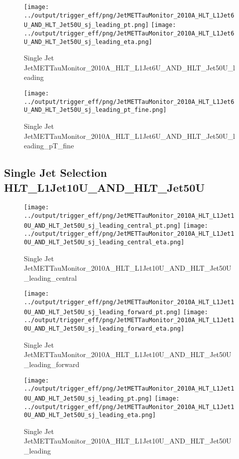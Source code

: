 \documentclass[11pt]{article}
\begin{document}
\begin{figure}[ht]
\centering
\texttt{[image: ../output/trigger\_eff/png/JetMETTauMonitor\_2010A\_HLT\_L1Jet6U\_AND\_HLT\_Jet50U\_sj\_leading\_pt.png]}
\texttt{[image: ../output/trigger\_eff/png/JetMETTauMonitor\_2010A\_HLT\_L1Jet6U\_AND\_HLT\_Jet50U\_sj\_leading\_eta.png]}
\caption{Single Jet JetMETTauMonitor\_2010A\_HLT\_L1Jet6U\_AND\_HLT\_Jet50U\_leading}
\label{fig:jetmettaumon_sj_HLT_L1Jet6U_AND_HLT_Jet50U_leading}
\end{figure}

\begin{figure}[ht]
\centering
\texttt{[image: ../output/trigger\_eff/png/JetMETTauMonitor\_2010A\_HLT\_L1Jet6U\_AND\_HLT\_Jet50U\_sj\_leading\_pt\_fine.png]}
\caption{Single Jet JetMETTauMonitor\_2010A\_HLT\_L1Jet6U\_AND\_HLT\_Jet50U\_leading\_pT\_fine}
\label{fig:jetmettaumon_sj_HLT_L1Jet6U_AND_HLT_Jet50U_leading_pT_fine}
\end{figure}
\clearpage


\newpage
\subsection{Single Jet Selection HLT\_L1Jet10U\_AND\_HLT\_Jet50U}
\begin{figure}[ht]
\centering
\texttt{[image: ../output/trigger\_eff/png/JetMETTauMonitor\_2010A\_HLT\_L1Jet10U\_AND\_HLT\_Jet50U\_sj\_leading\_central\_pt.png]}
\texttt{[image: ../output/trigger\_eff/png/JetMETTauMonitor\_2010A\_HLT\_L1Jet10U\_AND\_HLT\_Jet50U\_sj\_leading\_central\_eta.png]}
\caption{Single Jet JetMETTauMonitor\_2010A\_HLT\_L1Jet10U\_AND\_HLT\_Jet50U\_leading\_central}
\label{fig:jetmettaumon_sj_HLT_L1Jet10U_AND_HLT_Jet50U_leading_central}
\end{figure}

\begin{figure}[ht]
\centering
\texttt{[image: ../output/trigger\_eff/png/JetMETTauMonitor\_2010A\_HLT\_L1Jet10U\_AND\_HLT\_Jet50U\_sj\_leading\_forward\_pt.png]}
\texttt{[image: ../output/trigger\_eff/png/JetMETTauMonitor\_2010A\_HLT\_L1Jet10U\_AND\_HLT\_Jet50U\_sj\_leading\_forward\_eta.png]}
\caption{Single Jet JetMETTauMonitor\_2010A\_HLT\_L1Jet10U\_AND\_HLT\_Jet50U\_leading\_forward}
\label{fig:jetmettaumon_sj_HLT_L1Jet10U_AND_HLT_Jet50U_leading_forward}
\end{figure}

\begin{figure}[ht]
\centering
\texttt{[image: ../output/trigger\_eff/png/JetMETTauMonitor\_2010A\_HLT\_L1Jet10U\_AND\_HLT\_Jet50U\_sj\_leading\_pt.png]}
\texttt{[image: ../output/trigger\_eff/png/JetMETTauMonitor\_2010A\_HLT\_L1Jet10U\_AND\_HLT\_Jet50U\_sj\_leading\_eta.png]}
\caption{Single Jet JetMETTauMonitor\_2010A\_HLT\_L1Jet10U\_AND\_HLT\_Jet50U\_leading}
\label{fig:jetmettaumon_sj_HLT_L1Jet10U_AND_HLT_Jet50U_leading}
\end{figure}
\end{document}
